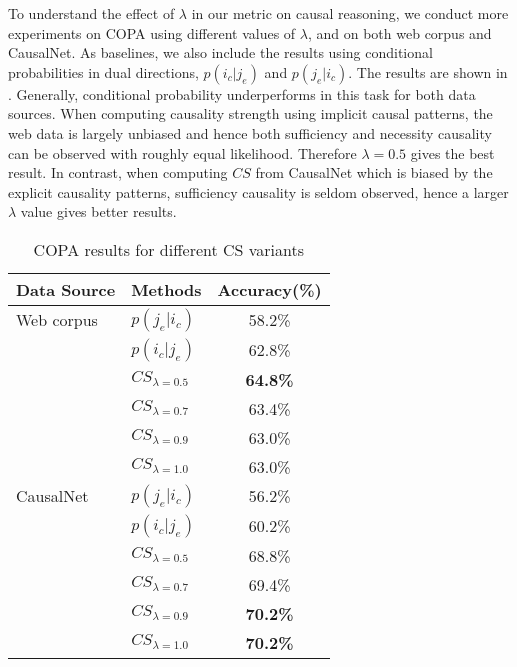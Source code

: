 
To understand the effect of $\lambda$ in our metric on 
causal reasoning, we conduct more experiments on COPA using different values
of $\lambda$, and on both web corpus and CausalNet. As baselines,
we also include the results using conditional probabilities in
dual directions, $p(i_c | j_e)$ and $p(j_e | i_c)$. The results
are shown in .
Generally, conditional probability underperforms in this task for
both data sources. When computing causality strength using implicit
causal patterns, 
the web data is largely unbiased and hence both
sufficiency and necessity causality can be observed with roughly
equal likelihood. Therefore $\lambda=0.5$ gives the best result.
In contrast, when computing $CS$ from CausalNet which is biased
by the explicit causality patterns, sufficiency causality is seldom
observed, hence a larger $\lambda$ value gives better results.

\begin{table}[th]
\small
\centering
\caption{COPA results for different CS variants}
\label{tab:varcs}
\begin{tabular}{llc}
\hline
Data Source & Methods & Accuracy(\%) \\
\hline
Web corpus & $p(j_e | i_c)$ & 58.2\%\\
 & $p(i_c | j_e)$ & 62.8\% \\
 & $CS_{\lambda=0.5}$ & {\bf 64.8\%} \\
 & $CS_{\lambda=0.7}$ & 63.4\% \\
 & $CS_{\lambda=0.9}$ & 63.0\% \\
 & $CS_{\lambda=1.0}$ & 63.0\% \\
 \hline
CausalNet & $p(j_e | i_c)$ & 56.2\% \\
 & $p(i_c | j_e)$ & 60.2\% \\
 & $CS_{\lambda=0.5}$ & 68.8\% \\
 & $CS_{\lambda=0.7}$ & 69.4\% \\
 & $CS_{\lambda=0.9}$ & {\bf 70.2\%} \\
 & $CS_{\lambda=1.0} $ & {\bf 70.2\%} \\
\hline
\end{tabular}
\end{table}


